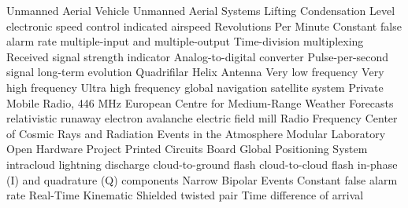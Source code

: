  {Unmanned Aerial Vehicle}
 {Unmanned Aerial Systems}
 {Lifting Condensation Level}
 {electronic speed control}
 {indicated airspeed}
 {Revolutions Per Minute}
 {Constant false alarm rate}
 {multiple-input and multiple-output}
 {Time-division multiplexing}
 {Received signal strength indicator}
 {Analog-to-digital converter}
 {Pulse-per-second signal}
 {long-term evolution}
 {Quadrifilar Helix Antenna}
 {Very low frequency}
 {Very high frequency}
 {Ultra high frequency}
 {global navigation satellite system}
 {Private Mobile Radio, 446 MHz}
 {European Centre for Medium-Range Weather Forecasts}
 {relativistic runaway electron avalanche}
 {electric field mill}
 {Radio Frequency}
 {Center of Cosmic Rays and Radiation Events in the Atmosphere}
 {Modular Laboratory Open Hardware Project}
 {Printed Circuits Board}
 {Global Positioning System}
 {intracloud lightning discharge}
 {cloud-to-ground flash}
 {cloud-to-cloud flash}
 {in-phase (I) and quadrature (Q) components}
 {Narrow Bipolar Events}
 {Constant false alarm rate}
 {Real-Time Kinematic}
 {Shielded twisted pair}
 {Time difference of arrival}


